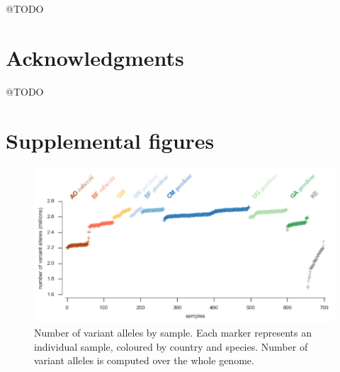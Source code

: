 \documentclass[a4paper,11pt,abstracton,hidelinks]{scrartcl}
\begin{document}
@TODO


\section{Acknowledgments}


@TODO


\printbibliography


\clearpage
\beginsupplement
\section{Supplemental figures}


\begin{figure}[h]
\centering
\includegraphics[width=1\textwidth,center]{artwork/chapter3/sample_variant_count.pdf}
\caption{Number of variant alleles by sample.
%
Each marker represents an individual sample, coloured by country and species.
%
Number of variant alleles is computed over the whole genome.
}
%
\label{fig:sample_variant_count}
\end{figure}
\end{document}
